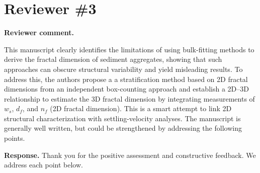 \documentclass[11pt]{article}
\newenvironment{Snippet}{%
  \par\vspace{0.3em}\begin{list}{}{\setlength{\leftmargin}{1em}\setlength{\rightmargin}{0.5em}}\item\small\itshape
}{%
  \end{list}\vspace{0.3em}
}
\begin{document}
\section*{Reviewer \#3}
\begin{enumerate}[label=\textbf{R3.\arabic*.}]

\item \textbf{Reviewer comment.}
\begin{Snippet}
This manuscript clearly identifies the limitations of using bulk-fitting methods to derive the fractal dimension of sediment aggregates, showing that such approaches can obscure structural variability and yield misleading results. To address this, the authors propose a a stratification method based on 2D fractal dimensions from an independent box-counting approach and establish a 2D--3D relationship to estimate the 3D fractal dimension by integrating measurements of $w_s$, $d_f$, and $n_f$ (2D fractal dimension). This is a smart attempt to link 2D structural characterization with settling-velocity analyses. The manuscript is generally well written, but could be strengthened by addressing the following points.
\end{Snippet}
\textbf{Response.}
Thank you for the positive assessment and constructive feedback. We address each point below.


\end{enumerate}
\end{document}
